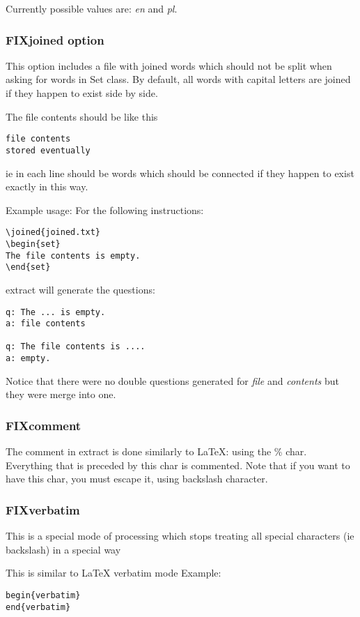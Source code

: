\documentclass[a4paper,11pt]{article}
\begin{document}
Currently possible values are: \textit{en} and \textit{pl}.

\subsubsection{FIXjoined option}
This option includes a file with joined words which should not be split when
asking for words in Set class.
By default, all words with capital letters are joined if they happen to exist
side by side.

The file contents should be like this
\begin{verbatim}
file contents
stored eventually
\end{verbatim}

ie in each line should be words which should be connected if they happen to
exist exactly in this way.

Example usage:
For the following instructions:
\begin{verbatim}
\joined{joined.txt}
\begin{set}
The file contents is empty.
\end{set}
\end{verbatim}
extract will generate the questions:
\begin{verbatim}
q: The ... is empty.
a: file contents

q: The file contents is ....
a: empty.
\end{verbatim}

Notice that there were no double questions generated for \textit{file} and
\textit{contents} but they were merge into one.

\subsubsection{FIXcomment}
The comment in extract is done similarly to LaTeX: using the \% char.
Everything that is preceded by this char is commented.
Note that if you want to have this char, you must escape it, using backslash
character.

\subsubsection{FIXverbatim}
This is a special mode of processing which stops treating all special
characters (ie backslash) in a special way

This is similar to LaTeX verbatim mode
Example:
\begin{verbatim}
begin{verbatim}
end{verbatim}
\end{verbatim}
\end{document}
